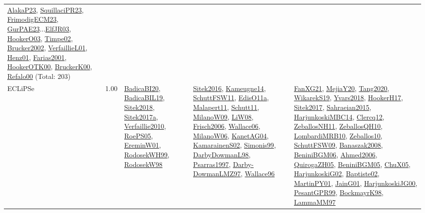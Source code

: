 {\begin{longtable}{p{3cm}r>{\raggedright\arraybackslash}p{6cm}>{\raggedright\arraybackslash}p{6cm}>{\raggedright\arraybackslash}p{8cm}}
\hyperref[detail:AlakaP23]{AlakaP23}, \hyperref[detail:SquillaciPR23]{SquillaciPR23}, \hyperref[detail:FrimodigECM23]{FrimodigECM23}, \hyperref[detail:GurPAE23]{GurPAE23}...\hyperref[detail:ElfJR03]{ElfJR03}, \hyperref[detail:HookerO03]{HookerO03}, \hyperref[detail:Timpe02]{Timpe02}, \hyperref[detail:Brucker2002]{Brucker2002}, \hyperref[detail:VerfaillieL01]{VerfaillieL01}, \hyperref[detail:Henz01]{Henz01}, \hyperref[detail:Farias2001]{Farias2001}, \hyperref[detail:HookerOTK00]{HookerOTK00}, \hyperref[detail:BruckerK00]{BruckerK00}, \hyperref[detail:Refalo00]{Refalo00} (Total: 203)\\
\index{ECLiPSe}\index{CPSystems!ECLiPSe}ECLiPSe &  1.00 & \hyperref[detail:BadicaBI20]{BadicaBI20}, \hyperref[detail:BadicaBIL19]{BadicaBIL19}, \hyperref[detail:Sitek2018]{Sitek2018}, \hyperref[detail:Sitek2017a]{Sitek2017a}, \hyperref[detail:Verfaillie2010]{Verfaillie2010}, \hyperref[detail:RoePS05]{RoePS05}, \hyperref[detail:EreminW01]{EreminW01}, \hyperref[detail:RodosekWH99]{RodosekWH99}, \hyperref[detail:RodosekW98]{RodosekW98} & \hyperref[detail:Sitek2016]{Sitek2016}, \hyperref[detail:Kameugne14]{Kameugne14}, \hyperref[detail:SchuttFSW11]{SchuttFSW11}, \hyperref[detail:EdisO11a]{EdisO11a}, \hyperref[detail:Malapert11]{Malapert11}, \hyperref[detail:Schutt11]{Schutt11}, \hyperref[detail:MilanoW09]{MilanoW09}, \hyperref[detail:LiW08]{LiW08}, \hyperref[detail:Frisch2006]{Frisch2006}, \hyperref[detail:Wallace06]{Wallace06}, \hyperref[detail:MilanoW06]{MilanoW06}, \hyperref[detail:KanetAG04]{KanetAG04}, \hyperref[detail:KamarainenS02]{KamarainenS02}, \hyperref[detail:Simonis99]{Simonis99}, \hyperref[detail:DarbyDowmanL98]{DarbyDowmanL98}, \hyperref[detail:Psarras1997]{Psarras1997}, \hyperref[detail:Darby-DowmanLMZ97]{Darby-DowmanLMZ97}, \hyperref[detail:Wallace96]{Wallace96} & \hyperref[detail:FanXG21]{FanXG21}, \hyperref[detail:MejiaY20]{MejiaY20}, \hyperref[detail:Tang2020]{Tang2020}, \hyperref[detail:WikarekS19]{WikarekS19}, \hyperref[detail:Yvars2018]{Yvars2018}, \hyperref[detail:HookerH17]{HookerH17}, \hyperref[detail:Sitek2017]{Sitek2017}, \hyperref[detail:Sahraeian2015]{Sahraeian2015}, \hyperref[detail:HarjunkoskiMBC14]{HarjunkoskiMBC14}, \hyperref[detail:Clercq12]{Clercq12}, \hyperref[detail:ZeballosNH11]{ZeballosNH11}, \hyperref[detail:ZeballosQH10]{ZeballosQH10}, \hyperref[detail:LombardiMRB10]{LombardiMRB10}, \hyperref[detail:Zeballos10]{Zeballos10}, \hyperref[detail:SchuttFSW09]{SchuttFSW09}, \hyperref[detail:Banaszak2008]{Banaszak2008}, \hyperref[detail:BeniniBGM06]{BeniniBGM06}, \hyperref[detail:Ahmed2006]{Ahmed2006}, \hyperref[detail:QuirogaZH05]{QuirogaZH05}, \hyperref[detail:BeniniBGM05]{BeniniBGM05}, \hyperref[detail:ChuX05]{ChuX05}, \hyperref[detail:HarjunkoskiG02]{HarjunkoskiG02}, \hyperref[detail:Baptiste02]{Baptiste02}, \hyperref[detail:MartinPY01]{MartinPY01}, \hyperref[detail:JainG01]{JainG01}, \hyperref[detail:HarjunkoskiJG00]{HarjunkoskiJG00}, \hyperref[detail:PesantGPR99]{PesantGPR99}, \hyperref[detail:BockmayrK98]{BockmayrK98}, \hyperref[detail:LammaMM97]{LammaMM97}\\

\end{longtable}}
